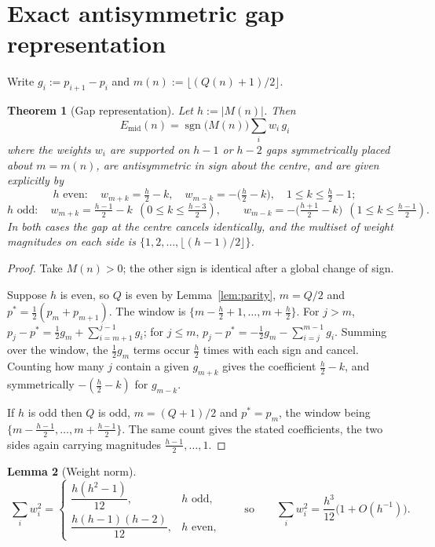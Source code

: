 \documentclass[11pt]{amsart}
\newtheorem{theorem}{Theorem}[section]
\newtheorem{lemma}[theorem]{Lemma}
\theoremstyle{definition}
\newcommand{\Mert}{M}
\newcommand{\Sq}{Q}
\begin{document}
\section{Exact antisymmetric gap representation}

Write $g_i:=p_{i+1}-p_i$ and $m(n):=\lfloor(\Sq(n)+1)/2\rfloor$.

\begin{theorem}[Gap representation]\label{thm:gaps}
Let $h:=|\Mert(n)|$. Then
\[
\boxed{\;
E_{\mathrm{mid}}(n)=\operatorname{sgn}\bigl(\Mert(n)\bigr)\sum_{i}w_i\,g_i \;}
\]
where the weights $w_i$ are supported on $h-1$ or $h-2$ gaps symmetrically
placed about $m=m(n)$, are antisymmetric in sign about the centre, and are given
explicitly by
\[
h \text{ even}:\quad
w_{m+k}=\tfrac h2-k,\quad w_{m-k}=-\bigl(\tfrac h2-k\bigr),\quad 1\le k\le \tfrac h2-1;
\]
\[
h \text{ odd}:\quad
w_{m+k}=\tfrac{h-1}2-k \ \ (0\le k\le \tfrac{h-3}2),
\qquad
w_{m-k}=-\bigl(\tfrac{h+1}2-k\bigr)\ \ (1\le k\le \tfrac{h-1}2).
\]
In both cases the gap at the centre cancels identically, and the multiset of
weight magnitudes on each side is $\{1,2,\dots,\lfloor (h-1)/2\rfloor\}$.
\end{theorem}

\begin{proof}
Take $\Mert(n)>0$; the other sign is identical after a global change of sign.

Suppose $h$ is even, so $\Sq$ is even by Lemma~\ref{lem:parity}, $m=\Sq/2$ and
$p^{*}=\tfrac12(p_m+p_{m+1})$. The window is $\{m-\tfrac h2+1,\dots,m+\tfrac h2\}$.
For $j>m$, $p_j-p^{*}=\tfrac12 g_m+\sum_{i=m+1}^{j-1}g_i$; for $j\le m$,
$p_j-p^{*}=-\tfrac12 g_m-\sum_{i=j}^{m-1}g_i$. Summing over the window, the
$\tfrac12 g_m$ terms occur $\tfrac h2$ times with each sign and cancel. Counting
how many $j$ contain a given $g_{m+k}$ gives the coefficient $\tfrac h2-k$, and
symmetrically $-(\tfrac h2-k)$ for $g_{m-k}$.

If $h$ is odd then $\Sq$ is odd, $m=(\Sq+1)/2$ and $p^{*}=p_m$, the window being
$\{m-\tfrac{h-1}2,\dots,m+\tfrac{h-1}2\}$. The same count gives the stated
coefficients, the two sides again carrying magnitudes
$\tfrac{h-1}2,\dots,1$.
\end{proof}

\begin{lemma}[Weight norm]\label{lem:w2}
\[
\boxed{\;
\sum_i w_i^{2}=
\begin{cases}
\dfrac{h(h^{2}-1)}{12}, & h \text{ odd},\\[3mm]
\dfrac{h(h-1)(h-2)}{12}, & h \text{ even},
\end{cases}
\qquad\text{so}\qquad
\sum_i w_i^{2}=\frac{h^{3}}{12}\bigl(1+O(h^{-1})\bigr). }
\]
\end{lemma}
\end{document}
